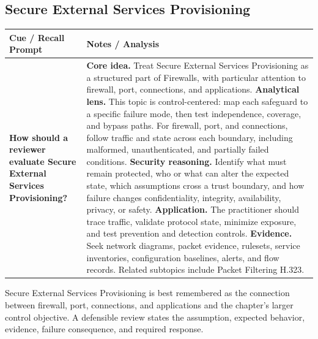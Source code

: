 \documentclass[11pt]{article}
\newcommand{\CornellHeader}{%
\rowcolor{Navy}\color{white}\bfseries Cue / Recall Prompt & \color{white}\bfseries Notes / Analysis\\\hline}
\newcommand{\CornellRow}[2]{%
\cellcolor{CueGray}\RaggedRight\textbf{#1} & \RaggedRight #2\\\hline}
\begin{document}
\subsection*{Secure External Services Provisioning}
\begin{longtable}{>{\RaggedRight\arraybackslash}p{}|>{\RaggedRight\arraybackslash}p{}}
\CornellHeader
\CornellRow{How should a reviewer evaluate Secure External Services Provisioning?}{\textbf{Core idea.} Treat Secure External Services Provisioning as a structured part of Firewalls, with particular attention to firewall, port, connections, and applications. \textbf{Analytical lens.} This topic is control-centered: map each safeguard to a specific failure mode, then test independence, coverage, and bypass paths. For firewall, port, and connections, follow traffic and state across each boundary, including malformed, unauthenticated, and partially failed conditions. \textbf{Security reasoning.} Identify what must remain protected, who or what can alter the expected state, which assumptions cross a trust boundary, and how failure changes confidentiality, integrity, availability, privacy, or safety. \textbf{Application.} The practitioner should trace traffic, validate protocol state, minimize exposure, and test prevention and detection controls. \textbf{Evidence.} Seek network diagrams, packet evidence, rulesets, service inventories, configuration baselines, alerts, and flow records. Related subtopics include Packet Filtering H.323.}
\end{longtable}
\begin{topicsummary}
Secure External Services Provisioning is best remembered as the connection between firewall, port, connections, and applications and the chapter's larger control objective. A defensible review states the assumption, expected behavior, evidence, failure consequence, and required response.
\end{topicsummary}
\end{document}
